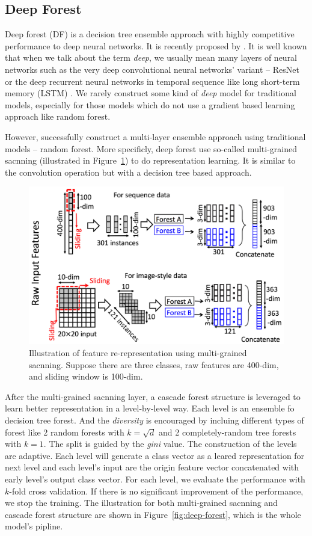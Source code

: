 \documentclass[sigconf]{acmart}
\begin{document}
	
	\subsection{Deep Forest}
	Deep forest (DF) is a decision tree ensemble approach with highly competitive performance to deep neural networks. It is recently proposed by \citet{zhou2017deep}. It is well known that when we talk about the term \textit{deep}, we usually mean many layers of neural networks such as the very deep convolutional neural networks' variant -- ResNet \cite{he2016deep} or the deep recurrent neural networks in temporal sequence like long short-term memory (LSTM) \cite{hochreiter1997long}. We rarely construct some kind of \textit{deep} model for traditional models, especially for those models which do not use a gradient based learning approach like random forest.
	
	However, \citet{zhou2017deep} successfully construct a multi-layer ensemble approach using traditional models -- random forest. More specificly, deep forest use so-called multi-grained sacnning (illustrated in Figure~\ref{fig:multi-grained-scanning}) to do representation learning. It is similar to the convolution operation but with a decision tree based approach. 
	\begin{figure}[h]
	\centering
	\includegraphics[width=0.8\linewidth]{../figs/multi-grained-scanning}
	\caption{ Illustration of feature re-representation using multi-grained sacnning. Suppose there are three classes, raw features are 400-dim, and sliding window is 100-dim.}
	\label{fig:multi-grained-scanning}
	\end{figure}
	
	After the multi-grained sacnning layer, a cascade forest structure is leveraged to learn better representation in a level-by-level way. Each level is an ensemble fo decision tree forest. And the \textit{diversity} is encouraged by incluing different types of forest like 2 random forests with $k=\sqrt{d}$ and 2 completely-random tree forests with $k=1$. The split is guided by the \textit{gini} value. The construction of the levels are adaptive. Each level will generate a class vector as a leared representation for next level and each level's input are the origin feature vector concatenated with early level's output class vector. For each level, we evaluate the performance with $k$-fold cross validation. If there is no significant improvement of the performance, we stop the training. The illustration for both multi-grained sacnning and cascade forest structure are shown in Figure~\ref{fig:deep-forest}, which is the whole model's pipline. 
	
\end{document}
